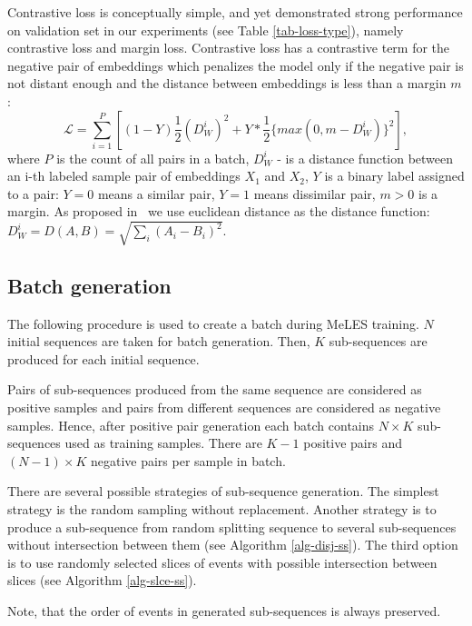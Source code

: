 \documentclass{article}
\begin{document}
Contrastive loss is conceptually simple, and yet demonstrated strong performance on validation set in our experiments (see Table \ref{tab-loss-type}), namely contrastive loss and margin loss.
Contrastive loss has a contrastive term for the negative pair of embeddings which penalizes the model only if the negative pair is not distant enough and the distance between embeddings is less than a margin $m$:  
\begin{equation}
 \mathcal{L} = \sum_{i=1}^P \left[ (1-Y)\frac{1}{2}(D_W^i)^2 +Y*\frac{1}{2}\{max(0,m-D_W^i)\}^2 \right],
\end{equation}
where $P$ is the count of all pairs in a batch, $D_W^i$ - is a distance function between an i-th labeled sample pair of embeddings $X_1$ and $X_2$, 
$Y$ is a binary label assigned to a pair: $Y = 0$ means a similar pair, $Y = 1$ means dissimilar pair, $m > 0$ is a margin.
As proposed in~\cite{Hadsell2006DimensionalityRB} we use euclidean distance as the distance function: $D_W^i = D(A,B) = \sqrt{\sum_i(A_i - B_i)^2}$.

\subsection{Batch generation}

The following procedure is used to create a batch during MeLES training. $N$ initial sequences are taken for batch generation. Then, $K$ sub-sequences are produced for each initial sequence.

Pairs of sub-sequences produced from the same sequence are considered as positive samples and pairs from different sequences are considered as negative samples. Hence, after positive pair generation each batch contains $N \times K$ sub-sequences used as training samples. There are $K-1$ positive pairs and $(N - 1) \times K$ negative pairs per sample in batch.

There are several possible strategies of sub-sequence generation. The simplest strategy is the random sampling without replacement. Another strategy is to produce a sub-sequence from random splitting sequence to several sub-sequences without intersection between them (see Algorithm \ref{alg-disj-ss}). The third option is to use randomly selected slices of events with possible intersection between slices (see Algorithm \ref{alg-slce-ss}). 

Note, that the order of events in generated sub-sequences is always preserved.
\end{document}
